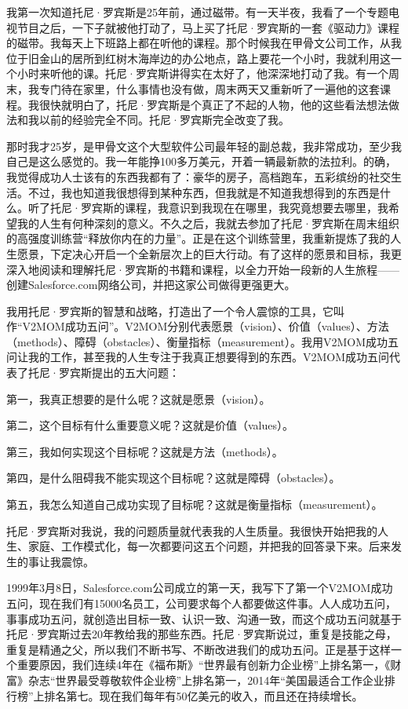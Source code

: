 

我第一次知道托尼·罗宾斯是25年前，通过磁带。有一天半夜，我看了一个专题电视节目之后，一下子就被他打动了，马上买了托尼·罗宾斯的一套《驱动力》课程的磁带。我每天上下班路上都在听他的课程。那个时候我在甲骨文公司工作，从我位于旧金山的居所到红树木海岸边的办公地点，路上要花一个小时，我就利用这一个小时来听他的课。托尼·罗宾斯讲得实在太好了，他深深地打动了我。有一个周末，我专门待在家里，什么事情也没有做，周末两天又重新听了一遍他的这套课程。我很快就明白了，托尼·罗宾斯是个真正了不起的人物，他的这些看法想法做法和我以前的经验完全不同。托尼·罗宾斯完全改变了我。

那时我才25岁，是甲骨文这个大型软件公司最年轻的副总裁，我非常成功，至少我自己是这么感觉的。我一年能挣100多万美元，开着一辆最新款的法拉利。的确，我觉得成功人士该有的东西我都有了：豪华的房子，高档跑车，五彩缤纷的社交生活。不过，我也知道我很想得到某种东西，但我就是不知道我想得到的东西是什么。听了托尼·罗宾斯的课程，我意识到我现在在哪里，我究竟想要去哪里，我希望我的人生有何种深刻的意义。不久之后，我就去参加了托尼·罗宾斯在周末组织的高强度训练营“释放你内在的力量”。正是在这个训练营里，我重新提炼了我的人生愿景，下定决心开启一个全新层次上的巨大行动。有了这样的愿景和目标，我更深入地阅读和理解托尼·罗宾斯的书籍和课程，以全力开始一段新的人生旅程——创建Salesforce.com网络公司，并把这家公司做得更强更大。

我用托尼·罗宾斯的智慧和战略，打造出了一个令人震惊的工具，它叫作“V2MOM成功五问”。V2MOM分别代表愿景（vision）、价值（values）、方法（methods）、障碍（obstacles）、衡量指标（measurement）。我用V2MOM成功五问让我的工作，甚至我的人生专注于我真正想要得到的东西。V2MOM成功五问代表了托尼·罗宾斯提出的五大问题：

第一，我真正想要的是什么呢？这就是愿景（vision）。

第二，这个目标有什么重要意义呢？这就是价值（values）。

第三，我如何实现这个目标呢？这就是方法（methods）。

第四，是什么阻碍我不能实现这个目标呢？这就是障碍（obstacles）。

第五，我怎么知道自己成功实现了目标呢？这就是衡量指标（measurement）。

托尼·罗宾斯对我说，我的问题质量就代表我的人生质量。我很快开始把我的人生、家庭、工作模式化，每一次都要问这五个问题，并把我的回答录下来。后来发生的事让我震惊。

1999年3月8日，Salesforce.com公司成立的第一天，我写下了第一个V2MOM成功五问，现在我们有15000名员工，公司要求每个人都要做这件事。人人成功五问，事事成功五问，就创造出目标一致、认识一致、沟通一致，而这个成功五问就基于托尼·罗宾斯过去20年教给我的那些东西。托尼·罗宾斯说过，重复是技能之母，重复是精通之父，所以我们不断书写、不断改进我们的成功五问。正是基于这样一个重要原因，我们连续4年在《福布斯》“世界最有创新力企业榜”上排名第一，《财富》杂志“世界最受尊敬软件企业榜”上排名第一，2014年“美国最适合工作企业排行榜”上排名第七。现在我们每年有50亿美元的收入，而且还在持续增长。

